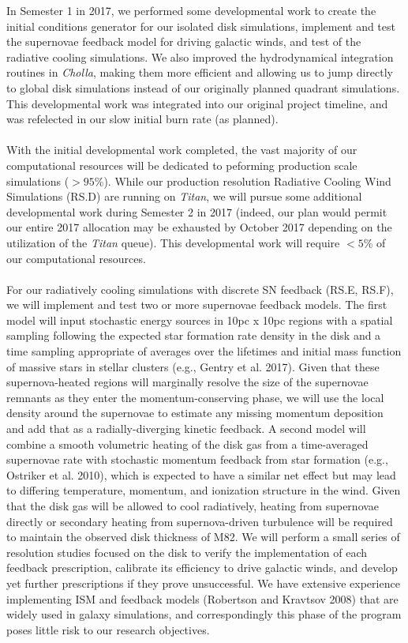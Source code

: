 \documentclass[11pt,letterpaper,english]{article}
\begin{document}
In Semester 1 in 2017, we performed some developmental work to create the initial conditions generator for our isolated
disk simulations, implement and test the supernovae feedback model for driving galactic winds, and test of the radiative
cooling simulations. We also improved the hydrodynamical integration routines in \textit{Cholla}, making them more efficient
and allowing us to jump directly to global disk simulations instead of our originally planned quadrant simulations. This
developmental work was integrated into our original project timeline, and was refelected in our slow initial burn rate (as
planned). 
~\\~\\
With the initial developmental work completed, the vast majority of our computational resources will be dedicated to peforming
production scale simulations ($>95$\%). While our production resolution Radiative Cooling Wind Simulations (RS.D) are running on \textit{Titan}, we will pursue some additional developmental work during Semester 2 in 2017 (indeed, our plan would permit our entire 2017 allocation may be exhausted by October 2017 depending on the utilization of the \textit{Titan} queue). This developmental work will require $<5$\% of our computational resources.
~\\~\\
For our radiatively cooling simulations with discrete SN feedback (RS.E, RS.F), we will implement and test two or more supernovae feedback models. The first model will input stochastic energy sources in 10pc x 10pc regions with a spatial sampling following the expected star formation rate density in the disk and a time sampling appropriate of averages over the lifetimes and initial mass function of massive stars in stellar clusters (e.g., Gentry et al. 2017). Given that these supernova-heated regions will marginally resolve the size of the supernovae remnants as they enter the momentum-conserving phase, we will use the local density around the supernovae to estimate any missing momentum deposition and add that as a radially-diverging kinetic feedback. A second model will combine a smooth volumetric heating of the disk gas from a time-averaged supernovae rate with stochastic momentum feedback from star formation (e.g., Ostriker et al. 2010), which is expected to have a similar net effect but may lead to differing temperature, momentum, and ionization structure in the wind.
Given that the disk gas will be allowed to cool radiatively, heating from supernovae directly or secondary heating from supernova-driven turbulence will be required to maintain the observed disk thickness of M82. We will perform a small series of resolution studies focused on the disk to verify the implementation of each feedback prescription, calibrate its efficiency to drive galactic winds, and develop yet further prescriptions if they prove unsuccessful. We have extensive experience implementing ISM and feedback models (Robertson and Kravtsov 2008) that are widely used in galaxy simulations, and correspondingly this phase of the program poses little risk to our research objectives. 
\end{document}
